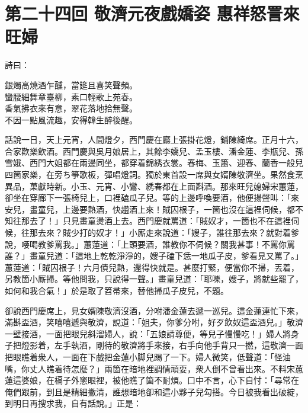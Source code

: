 
\chapter*{第二十四回 敬濟元夜戲嬌姿 惠祥怒詈來旺婦}


詩曰：

\begin{myquote} 
銀燭高燒酒乍醺，當筵且喜笑聲頻。\\蠻腰細舞章臺柳，素口輕歌上苑春。\\香氣拂衣來有意，翠花落地拾無聲。\\不因一點風流趣，安得韓生醉後醒。
\end{myquote} 

話說一日，天上元宵，人間燈夕，西門慶在廳上張掛花燈，鋪陳綺席。正月十六，合家歡樂飲酒。西門慶與吳月娘居上，其餘李嬌兒、孟玉樓、潘金蓮、李瓶兒、孫雪娥、西門大姐都在兩邊同坐，都穿着錦綉衣裳。春梅、玉簫、迎春、蘭香一般兒四箇家樂，在旁ち箏歌板，彈唱燈詞。獨於東首設一席與女婿陳敬濟坐。果然食烹異品，菓獻時新。小玉、元宵、小鸞、綉春都在上面斟酒。那來旺兒媳婦宋蕙蓮，卻坐在穿廊下一張椅兒上，口裡磕瓜子兒。等的上邊呼喚要酒，他便揚聲叫：「來安兒，畫童兒，上邊要熱酒，快趲酒上來！賊囚根子，一箇也沒在這裡伺候，都不知往那去了！」{}只見畫童燙酒上去。西門慶就罵道：「賊奴才，一箇也不在這裡伺候，往那去來？賊少打的奴才！」{}小厮走來說道：「嫂子，誰往那去來？就對着爹說，喓喝教爹罵我。」蕙蓮道：「上頭要酒，誰教你不伺候？關我甚事！不罵你罵誰？」畫童兒道：「這地上乾乾淨淨的，嫂子磕下恁一地瓜子皮，爹看見又罵了。」蕙蓮道：「賊囚根子！六月債兒熱，還得快就是。甚麼打緊，便當你不掃，丟着，另教箇小厮掃。等他問我，只說得一聲。」畫童兒道：「耶嚛，嫂子，將就些罷了，如何和我合氣！」於是取了笤帚來，替他掃瓜子皮兒，不題。

卻說西門慶席上，見女婿陳敬濟沒酒，分咐潘金蓮去遞一巡兒。{}{}這金蓮連忙下來，滿斟盃酒，笑嘻嘻遞與敬濟，說道：「姐夫，你爹分咐，好歹飲奴這盃酒兒。」敬濟一壁接酒，一面把眼兒斜溜婦人，說：「五娘請尊便，等兒子慢慢吃！」婦人將身子把燈影着，左手執酒，剛待的敬濟將手來接，右手向他手背只一撚，這敬濟一面把眼瞧着衆人，一面在下戲把金蓮小脚兒踢了一下。婦人微笑，低聲道：「怪油嘴，你丈人瞧着待怎麼？」兩箇在暗地裡調情頑耍，衆人倒不曾看出來。{}不料宋蕙蓮這婆娘，在槅子外窻眼裡，被他瞧了箇不耐煩。{}口中不言，心下自忖：「尋常在俺們跟前，到且是精細撇清，誰想暗地卻和這小夥子兒勾搭。今日被我看出破綻，到明日再搜求我，自有話說。」正是：

